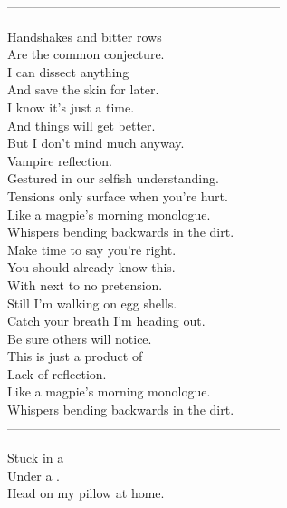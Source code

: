 -----------------------------------------------------------------



Handshakes and bitter rows \\
Are the common conjecture. \\
I can dissect anything \\
And save the skin for later. \\

I know it's just a time. \\
And things will get better. \\
But I don't mind much anyway. \\
Vampire reflection. \\

Gestured in our selfish understanding. \\
Tensions only surface when you're hurt. \\
Like a magpie's morning monologue. \\
Whispers bending backwards in the dirt. \\

Make time to say you're right. \\
You should already know this. \\
With next to no pretension. \\
Still I'm walking on egg shells. \\

Catch your breath I'm heading out. \\
Be sure others will notice. \\
This is just a product of \\
Lack of reflection. \\

Like a magpie's morning monologue. \\
Whispers bending backwards in the dirt. \\

-----------------------------------------------------------------



Stuck in a  \\
Under a . \\
Head on my pillow at home. \\

